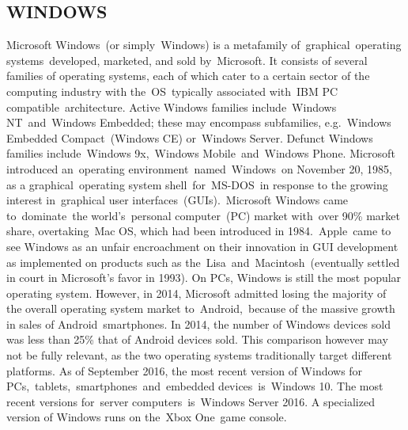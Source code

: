 \documentclass[11pt]{report} %
\begin{document}
\subsection{WINDOWS}
\label{subsec:WINDOWS}
Microsoft Windows (or simply Windows) is a metafamily of graphical operating systems developed, marketed, and sold by Microsoft. It consists of several families of operating systems, each of which cater to a certain sector of the computing industry with the OS typically associated with IBM PC compatible architecture. Active Windows families include Windows NT and Windows Embedded; these may encompass subfamilies, e.g. Windows Embedded Compact (Windows CE) or Windows Server. Defunct Windows families include Windows 9x, Windows Mobile and Windows Phone.
Microsoft introduced an operating environment named Windows on November 20, 1985, as a graphical operating system shell for MS-DOS in response to the growing interest in graphical user interfaces (GUIs). Microsoft Windows came to dominate the world's personal computer (PC) market with over 90\% market share, overtaking Mac OS, which had been introduced in 1984. Apple came to see Windows as an unfair encroachment on their innovation in GUI development as implemented on products such as the Lisa and Macintosh (eventually settled in court in Microsoft's favor in 1993). On PCs, 
Windows is still the most popular operating system. However, in 2014, Microsoft admitted losing the majority of the overall operating system market to Android, because of the massive growth in sales of Android smartphones. In 2014, the number of Windows devices sold was less than 25\% that of Android devices sold. This comparison however may not be fully relevant, as the two operating systems traditionally target different platforms.
As of September 2016, the most recent version of Windows for PCs, tablets, smartphones and embedded devices is Windows 10. The most recent versions for server computers is Windows Server 2016. A specialized version of Windows runs on the Xbox One game console.
\end{document}
